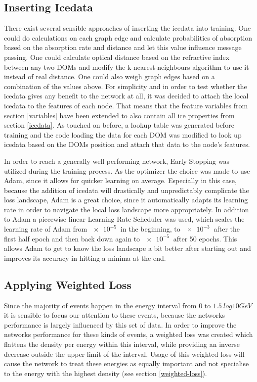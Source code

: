 \documentclass[a4paper,10pt]{scrartcl}
\begin{document}
\subsection{Inserting Icedata}

There exist several sensible approaches of inserting the icedata into training.
One could do calculations on each graph edge and calculate probabilities of absorption based on the absorption rate and distance and let this value influence message passing.
One could calculate optical distance based on the refractive index between any two DOMs and modify the k-nearest-neighbours algorithm to use it instead of real distance.
One could also weigh graph edges based on a combination of the values above.
For simplicity and in order to test whether the icedata gives any benefit to the network at all, it was decided to attach the local icedata to the features of each node.
That means that the feature variables from section \ref{variables} have been extended to also contain all ice properties from section \ref{icedata}.
As touched on before, a lookup table was generated before training and the code loading the data for each DOM was modified to look up icedata based on the DOMs position and attach that data to the node's features.

In order to reach a generally well performing network, Early Stopping was utilized during the training process.
As the optimizer the choice was made to use Adam, since it allows for quicker learning on average.
Especially in this case, because the addition of icedata will drastically and unpredictably complicate the loss landscape, Adam is a great choice, since it automatically adapts its learning rate in order to navigate the local loss landscape more appropriately.
In addition to Adam a piecewise linear Learning Rate Scheduler was used, which scales the learning rate of Adam from $\SI{e-5}{}$ in the beginning, to $\SI{e-3}{}$ after the first half epoch and then back down again to $\SI{e-5}{}$ after 50 epochs.
This allows Adam to get to know the loss landscape a bit better after starting out and improves its accuracy in hitting a minima at the end.

\subsection{Applying Weighted Loss}

Since the majority of events happen in the energy interval from $0$ to $\SI{1.5}{log10 GeV}$ it is sensible to focus our attention to these events, because the networks performance is largely influenced by this set of data.
In order to improve the networks performance for these kinds of events, a weighted loss was created which flattens the density per energy within this interval, while providing an inverse decrease outside the upper limit of the interval.
Usage of this weighted loss will cause the network to treat these energies as equally important and not specialise to the energy with the highest density (see section \ref{weighted-loss}).
\end{document}
